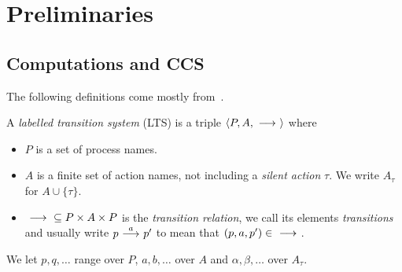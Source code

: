 \section{Preliminaries}\label{sec:preliminaries}
\subsection{Computations and CCS} %
The following definitions come mostly from~\cite{DeNicola:1990}.

\begin{definition}
    A \emph{labelled transition system} (LTS)
    is a triple $\langle P,A,\ {\stackrel{{}}{\longrightarrow}}\ \rangle$ where
    \begin{itemize}
        \item $P$ is a set of process names.
        \item $A$ is a finite set of action names, not including a \emph{silent action}
              $\tau$. We write $A_\tau$ for $A\cup \{\tau\}$.
        \item $\ {\stackrel{{}}{\longrightarrow}}\ \subseteq P\times A\times P$ is the \emph{transition
              relation}, we call its elements \emph{transitions} and
              usually write $p\ {\stackrel{{a}}{\longrightarrow}}\ p'$ to mean that $(p,a,p')\in\ {\stackrel{{}}{\longrightarrow}}\ $.
    \end{itemize}
    We let $p,q,\dots$ range over $P$, $a,b,\dots$ over $A$ and $\alpha,\beta,\dots$
    over $A_\tau$.
\end{definition}

